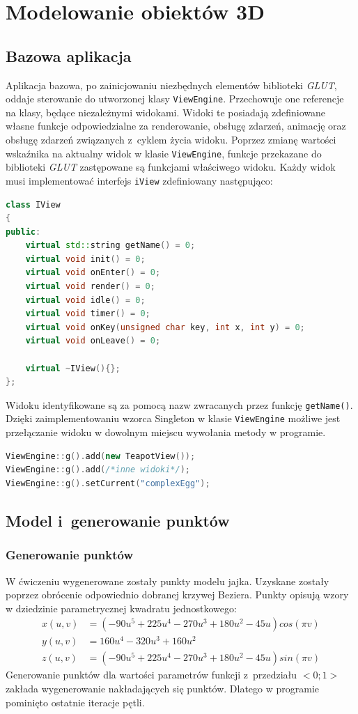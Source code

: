 \newpage
\section{Modelowanie obiektów 3D}
\subsection{Bazowa aplikacja}
Aplikacja bazowa, po zainicjowaniu niezbędnych elementów biblioteki \textit{GLUT}, oddaje sterowanie do utworzonej klasy \lstinline{ViewEngine}. Przechowuje one referencje na klasy, będące niezależnymi widokami. Widoki te posiadają zdefiniowane własne funkcje odpowiedzialne za renderowanie, obsługę zdarzeń, animację oraz obsługę zdarzeń związanych z~cyklem życia widoku. Poprzez zmianę wartości wskaźnika na aktualny widok w klasie \lstinline{ViewEngine}, funkcje przekazane do biblioteki \textit{GLUT} zastępowane są funkcjami właściwego widoku. Każdy widok musi implementować interfejs \lstinline{iView} zdefiniowany następująco:

\begin{lstlisting}[language=C++, caption=Interfejs IView.]
class IView
{
public:
    virtual std::string getName() = 0;
    virtual void init() = 0;
    virtual void onEnter() = 0;
    virtual void render() = 0;
    virtual void idle() = 0;
    virtual void timer() = 0;
    virtual void onKey(unsigned char key, int x, int y) = 0;
    virtual void onLeave() = 0;

    virtual ~IView(){};
};
\end{lstlisting}
Widoku identyfikowane są za pomocą nazw zwracanych przez funkcję \lstinline{getName()}.
Dzięki zaimplementowaniu wzorca Singleton w klasie \lstinline{ViewEngine} możliwe jest przełączanie widoku w dowolnym miejscu wywołania metody w programie.
\begin{lstlisting}[language=C++, caption=Tworzeznie instancji widoków i~ustawianie obecnego. Funkcja \lstinline{g} zwraca instancję klasy.]
ViewEngine::g().add(new TeapotView());
ViewEngine::g().add(/*inne widoki*/);
ViewEngine::g().setCurrent("complexEgg");
\end{lstlisting}
\subsection{Model i~generowanie punktów}
\subsubsection{Generowanie punktów}
W ćwiczeniu wygenerowane zostały punkty modelu jajka. Uzyskane zostały poprzez obrócenie odpowiednio dobranej krzywej Beziera. Punkty opisują wzory w dziedzinie parametrycznej kwadratu jednostkowego:
\begin{align*}
    x(u,v)&=(-90u^5+225u^4-270u^3+180u^2-45u)cos(\pi v)\\
    y(u,v)&=160u^4-320u^3+160u^2\\
    z(u,v)&=(-90u^5+225u^4-270u^3+180u^2-45u)sin(\pi v)
\end{align*}
Generowanie punktów dla wartości parametrów funkcji z~przedziału $<0;1>$ zakłada wygenerowanie nakładających się punktów. Dlatego w programie pominięto ostatnie iteracje pętli.
